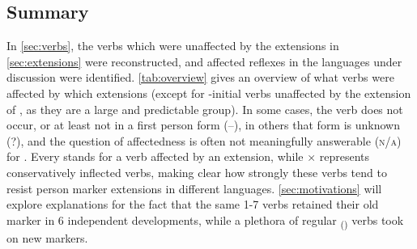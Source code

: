 \subsection{Summary}
\label{sec:verbsummary}
In \cref{sec:verbs}, the verbs which were unaffected by the extensions in \cref{sec:extensions} were reconstructed, and affected reflexes in the languages under discussion were identified.
\cref{tab:overview} gives an overview of what verbs were affected by which extensions (except for -initial \akuriyo verbs unaffected by the extension of , as they are a large and predictable group).
In some cases, the verb does not occur, or at least not in a first person form (–), in others that form is unknown (?), and the question of affectedness is often not meaningfully answerable (\textsc{n/a}) for .
Every \checkmark stands for a verb affected by an extension, while × represents conservatively inflected verbs, making clear how strongly these verbs tend to resist person marker extensions in different languages.
\cref{sec:motivations} will explore explanations for the fact that the same 1-7 verbs retained their old  marker in 6 independent developments, while a plethora of regular \textsubscript{()} verbs took on new markers.

